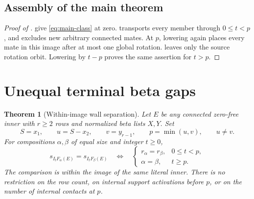 \documentclass[11pt,a4paper]{amsart}
\numberwithin{equation}{section}
\theoremstyle{plain}
\newtheorem{theorem}{Theorem}[section]
\theoremstyle{definition}
\begin{document}
\subsection{Assembly of the main theorem}\label{subsec:assembly}

\begin{proof}[Proof of ]
 give
\eqref{eq:main-class} at zero.   transports every
member through \(0\le t<p\), and  excludes
new arbitrary connected mates.  At \(p\), lowering again places
every mate in this image after at most one global rotation.
 leaves only the source rotation orbit.
Lowering by \(t-p\) proves the same assertion for \(t>p\).
\end{proof}

\section{Unequal terminal beta gaps}\label{sec:asymmetric-wall}

\begin{theorem}[Within-image wall separation]\label{thm:asymmetric-wall}
Let \(E\) be any connected zero-free inner with \(r\ge2\)
rows and normalized beta lists \(X,Y\).  Set
\[
 S=x_1,\qquad u=S-x_2,\qquad v=y_{r-1},\qquad
 p=\min(u,v),\qquad u\ne v.
\]
For compositions \(\alpha,\beta\) of equal size and integer
\(t\ge0\),
\[
 s_{I_tF_\alpha(E)}=s_{I_tF_\beta(E)}
 \quad\Longleftrightarrow\quad
 \begin{cases}
 r_\alpha=r_\beta,&0\le t<p,\\
 \alpha=\beta,&t\ge p.
 \end{cases}
\]
The comparison is within the image of the same literal inner.  There
is no restriction on the row count, on internal support activations
before \(p\), or on the number of internal contacts at \(p\).
\end{theorem}
\end{document}

